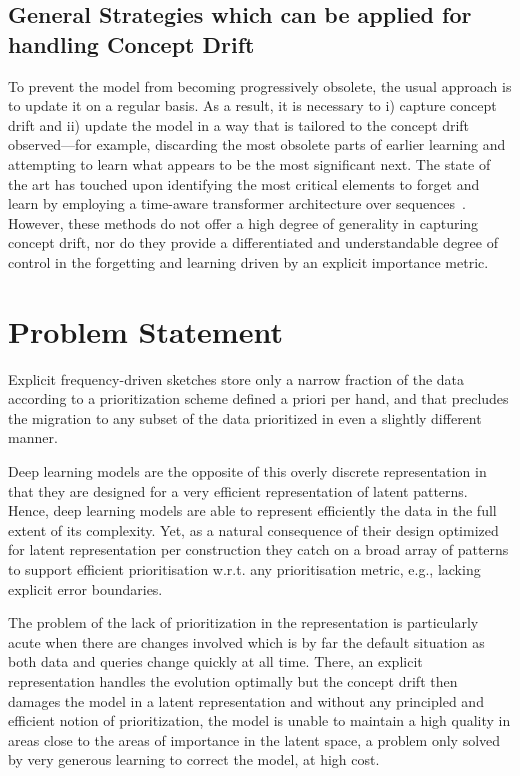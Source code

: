 \subsection{General Strategies which can be applied for handling Concept Drift}

To prevent the model from becoming progressively obsolete, the usual approach is to update it on a regular basis.
% 
As a result, it is necessary to i) capture concept drift and ii) update the model in a way that is tailored to the concept drift observed---for example, discarding the most obsolete parts of earlier learning and attempting to learn what appears to be the most significant next.
% 
The state of the art has touched upon identifying the most critical elements to forget and learn by employing a time-aware transformer architecture over sequences~\cite{zhang2020time,ren2021rapt,sawhney2020time}.
% 
However, these methods do not offer a high degree of generality in capturing concept drift, nor do they provide a differentiated and understandable degree of control in the forgetting and learning driven by an explicit importance metric.


\section{Problem Statement}

Explicit frequency-driven sketches store only a narrow fraction of the data according to a prioritization scheme defined a priori per hand, and that precludes the migration to any subset of the data prioritized in even a slightly different manner.

Deep learning models are the opposite of this overly discrete representation in that they are designed for a very efficient representation of latent patterns. Hence, deep learning models are able to represent efficiently the data in the full extent of its complexity. Yet, as a natural consequence of their design optimized for latent representation per construction they catch on a broad array of patterns to support efficient prioritisation w.r.t. any prioritisation metric, e.g., lacking explicit error boundaries.

The problem of the lack of prioritization in the representation is particularly acute when there are changes involved which is by far the default situation as both data and queries change quickly at all time. There, an explicit representation handles the evolution optimally but the concept drift then damages the model in a latent representation and without any principled and efficient notion of prioritization, the model is unable to maintain a high quality in areas close to the areas of importance in the latent space, a problem only solved by very generous learning to correct the model, at high cost.

